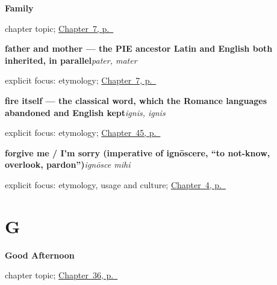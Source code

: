 \noindent\begin{minipage}[t]{\linewidth}
\raggedright
\textbf{Family}\par
\footnotesize chapter topic; \hyperref[ch:la-family]{Chapter~7, p.~\pageref*{ch:la-family}}
\end{minipage}\par\smallskip

\noindent\begin{minipage}[t]{\linewidth}
\raggedright
\textbf{father and mother — the PIE ancestor Latin and English both inherited, in parallel}\enspace\emph{pater, mater}\par
\footnotesize explicit focus: etymology; \hyperref[ch:la-family]{Chapter~7, p.~\pageref*{ch:la-family}}
\end{minipage}\par\smallskip

\noindent\begin{minipage}[t]{\linewidth}
\raggedright
\textbf{fire itself — the classical word, which the Romance languages abandoned and English kept}\enspace\emph{ignis, ignis}\par
\footnotesize explicit focus: etymology; \hyperref[ch:la-mundus]{Chapter~45, p.~\pageref*{ch:la-mundus}}
\end{minipage}\par\smallskip

\noindent\begin{minipage}[t]{\linewidth}
\raggedright
\textbf{forgive me / I'm sorry (imperative of ignōscere, \textquotedblleft{}to not-know, overlook, pardon\textquotedblright{})}\enspace\emph{ignōsce mihi}\par
\footnotesize explicit focus: etymology, usage and culture; \hyperref[ch:la-sorry]{Chapter~4, p.~\pageref*{ch:la-sorry}}
\end{minipage}\par\smallskip

\section*{G}

\noindent\begin{minipage}[t]{\linewidth}
\raggedright
\textbf{Good Afternoon}\par
\footnotesize chapter topic; \hyperref[ch:la-good-afternoon]{Chapter~36, p.~\pageref*{ch:la-good-afternoon}}
\end{minipage}\par\smallskip

